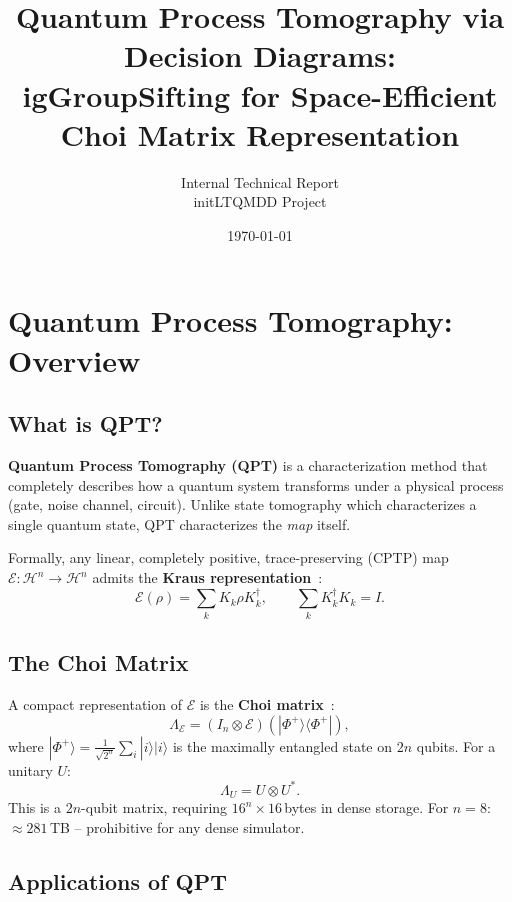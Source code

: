 \documentclass[11pt,a4paper]{article}
\title{\textbf{Quantum Process Tomography via Decision Diagrams:\\
igGroupSifting for Space-Efficient Choi Matrix Representation}}
\author{Internal Technical Report \\ \small initLTQMDD Project}
\date{\today}
\begin{document}
\maketitle
\tableofcontents
\newpage

\section{Quantum Process Tomography: Overview}

\subsection{What is QPT?}

\textbf{Quantum Process Tomography (QPT)} is a characterization method that
completely describes how a quantum system transforms under a physical process
(gate, noise channel, circuit). Unlike state tomography which characterizes
a single quantum state, QPT characterizes the \emph{map} itself.

Formally, any linear, completely positive, trace-preserving (CPTP) map
$\mathcal{E}: \mathcal{H}^n \to \mathcal{H}^n$ admits the
\textbf{Kraus representation}~\cite{kraus1983states}:
\begin{equation}
  \mathcal{E}(\rho) = \sum_k K_k \rho K_k^\dagger,
  \qquad \sum_k K_k^\dagger K_k = I.
\end{equation}

\subsection{The Choi Matrix}

A compact representation of $\mathcal{E}$ is the
\textbf{Choi matrix}~\cite{choi1975completely}:
\begin{equation}
  \Lambda_\mathcal{E} = (I_n \otimes \mathcal{E})(|\Phi^+\rangle\langle\Phi^+|),
\end{equation}
where $|\Phi^+\rangle = \frac{1}{\sqrt{2^n}}\sum_{i}|i\rangle|i\rangle$
is the maximally entangled state on $2n$ qubits. For a unitary $U$:
\begin{equation}
  \Lambda_U = U \otimes U^*.
\end{equation}
This is a $2n$-qubit matrix, requiring $16^n \times 16$\,bytes in dense storage.
For $n=8$: $\approx 281$\,TB -- prohibitive for any dense simulator.

\subsection{Applications of QPT}
\end{document}
